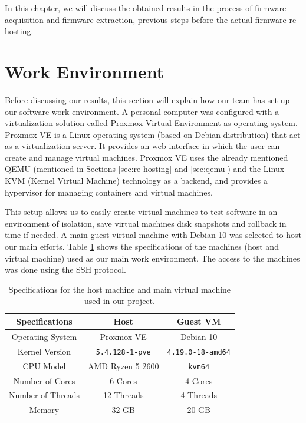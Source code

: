 In this chapter, we will discuss the obtained results in the process of firmware acquisition and firmware extraction, previous steps before the actual firmware re-hosting.

\section{Work Environment}

Before discussing our results, this section will explain how our team has set up our software work environment. A personal computer was configured with a virtualization solution called Proxmox Virtual Environment as operating system. Proxmox VE is a Linux operating system (based on Debian distribution) that act as a virtualization server. It provides an web interface in which the user can create and manage virtual machines. Proxmox VE uses the already mentioned QEMU \cite{qemu} (mentioned in Sections \ref{sec:re-hosting} and \ref{sec:qemu}) and the Linux KVM (Kernel Virtual Machine) technology as a backend, and provides a hypervisor for managing containers and virtual machines.

This setup allows us to easily create virtual machines to test software in an environment of isolation, save virtual machines disk snapshots and rollback in time if needed. A main guest virtual machine with Debian 10 was selected to host our main efforts. Table \ref{tab:vm-specs} shows the specifications of the machines (host and virtual machine) used as our main work environment. The access to the machines was done using the SSH protocol.

\begin{table}[H]
\centering
\caption{Specifications for the host machine and main virtual machine used in our project.}
\begin{tabular}{ccc}
\hline
\textbf{Specifications} & \textbf{Host} & \textbf{Guest VM} \\ \hline
Operating System        & Proxmox VE           & Debian 10             \\
Kernel Version          & {\tt5.4.128-1-pve}   & {\tt 4.19.0-18-amd64} \\
CPU Model               & AMD Ryzen 5 2600     & {\tt kvm64}           \\
Number of Cores         & 6 Cores              & 4 Cores               \\
Number of Threads       & 12 Threads           & 4 Threads             \\
Memory                  & 32 GB                & 20 GB                 \\ \hline
\end{tabular}
\label{tab:vm-specs}
\end{table}

